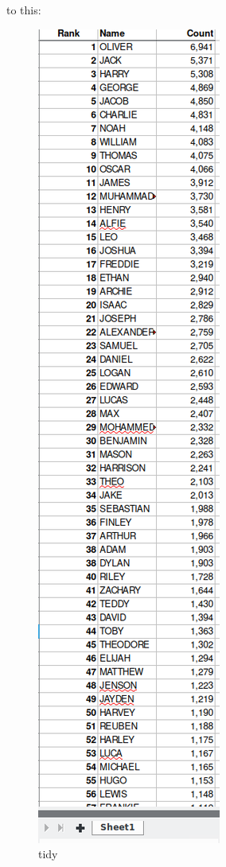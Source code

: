\documentclass[]{book}
\begin{document}
to this:

\begin{figure}
\centering
\includegraphics{R/RDataWrangling/images/clean.png}
\caption{tidy}
\end{figure}
\end{document}
